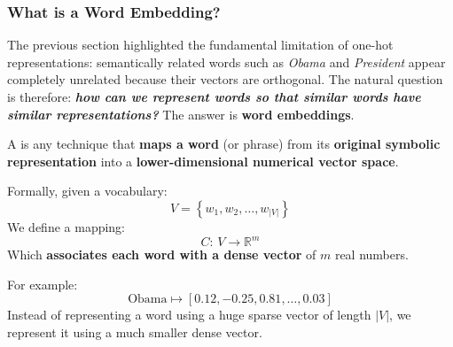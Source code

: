 \subsubsection{What is a Word Embedding?}\label{sec:what-is-a-word-embedding}

The previous section highlighted the fundamental limitation of one-hot representations: semantically related words such as \emph{Obama} and \emph{President} appear completely unrelated because their vectors are orthogonal. The natural question is therefore: \textbf{\emph{how can we represent words so that similar words have similar representations?}} The answer is \textbf{word embeddings}.

\highspace
\begin{definitionbox}
    A  is any technique that \textbf{maps a word} (or phrase) from its \textbf{original symbolic representation} into a \textbf{lower-dimensional numerical vector space}.

    \highspace
    Formally, given a vocabulary:
    \begin{equation*}
        V = \left\{w_1, w_2, \ldots, w_{\left|V\right|}\right\}
    \end{equation*}
    We define a mapping:
    \begin{equation*}
        C: \, V \rightarrow \mathbb{R}^{m}
    \end{equation*}
    Which \textbf{associates each word with a dense vector} of $m$ real numbers.

    \highspace
    For example:
    \begin{equation*}
        \text{Obama} \mapsto \left[0.12, -0.25, 0.81, \dots, 0.03\right]
    \end{equation*}
    Instead of representing a word using a huge sparse vector of length $\left|V\right|$, we represent it using a much smaller dense vector.
\end{definitionbox}

